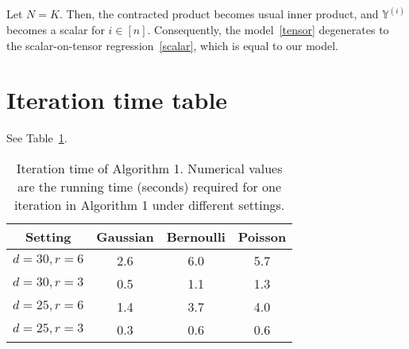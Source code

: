 \documentclass[11pt]{article}
\theoremstyle{plain}
\theoremstyle{definition}
\begin{document}
Let $N = K$. Then, the contracted product becomes usual inner product, and $\mathbb{Y}^{(i)}$ becomes a scalar for $i \in [n]$. Consequently, the model~\eqref{tensor} degenerates to the scalar-on-tensor regression~\eqref{scalar}, which is equal to our model.


\section{Iteration time table}

See Table~\ref{tab:time}.
\begin{table}[h]
\centering
\begin{tabular}{|c|c|c|c|}
\hline
Setting &Gaussian& Bernoulli & Poisson  \\ \hline
$d = 30, r = 6$& 2.6 &  6.0& 5.7\\
$d = 30, r = 3$&  0.5 & 1.1&1.3\\
$d = 25, r = 6$&1.4 & 3.7& 4.0\\
$d = 25, r = 3$&0.3& 0.6& 0.6\\
\hline
\end{tabular}
\caption{ Iteration time of Algorithm 1. Numerical values are the running time (seconds) required for one iteration in Algorithm 1 under different settings.  }\label{tab:time}
\end{table}




\end{document}
